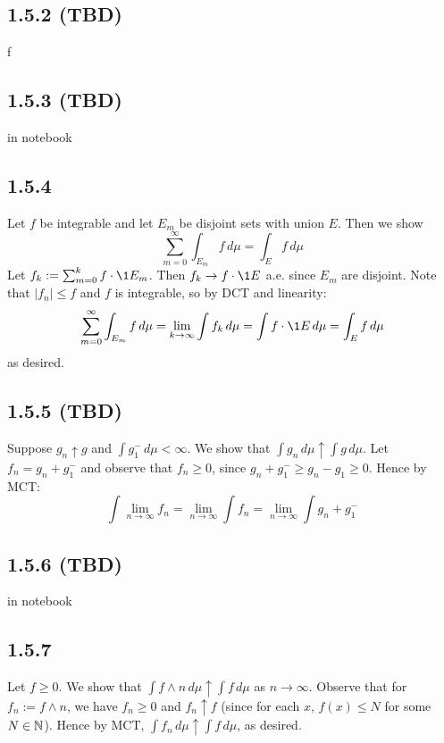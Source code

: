 \documentclass[11pt]{article}
\begin{document}
\subsection*{1.5.2 (TBD)}


f

\subsection*{1.5.3 (TBD)}


in notebook



\subsection*{1.5.4}

Let $f$ be integrable and let $E_m$ be disjoint sets with union $E$. Then we show \[\sum_{m=0}^{\infty} \int_{E_m}f \,d\mu = \int_{E}f \,d\mu \] Let $f_k := \sum_{m=0}^{k} f\cdot \1{E_m}$. Then $f_k \to f \cdot \1{E}$ a.e. since $E_m$ are disjoint. Note that $|f_n| \leq f$ and $f$ is integrable, so by DCT and linearity: \[\sum_{m=0}^{\infty} \int_{E_m}f \,d\mu = \lim_{k\to \infty}\int f_k \,d\mu = \int f \cdot \1{E} \,d\mu=\int_{E}f \,d\mu \] as desired.

\subsection*{1.5.5 (TBD)}

Suppose $g_n \uparrow g$ and $\int g_1^- \, d\mu < \infty$. We show that $\int g_n \, d\mu \uparrow\int g \, d\mu$. Let $f_n = g_n + g_1^-$ and observe that $f_n \geq 0$, since $g_n + g_1^- \geq g_n - g_1 \geq 0$. Hence by MCT: \[\int \lim_{n\to\infty}  f_n = \lim_{n\to\infty} \int f_n = \lim_{n\to\infty} \int g_n + g_1^-\]

\subsection*{1.5.6 (TBD)}


in notebook



\subsection*{1.5.7}

Let $f\geq 0$. We show that $\int f \wedge n \,d\mu \uparrow \int f \,d\mu$ as $n \to \infty$. Observe that for $f_n := f \wedge n$, we have $f_n \geq 0$ and $f_n\uparrow f$ (since for each $x$, $f(x) \leq N$ for some $N \in {\mathbb N}$). Hence by MCT, $\int f_n \,d\mu \uparrow \int f \,d\mu$, as desired. 
\end{document}
